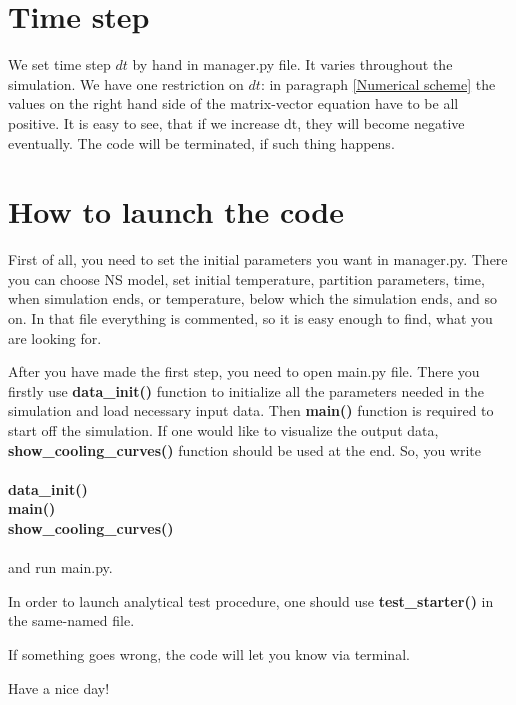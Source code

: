 \documentclass[preprint,pre,floats,aps,amsmath,amssymb]{revtex4}
\begin{document}
\section{Time step}
\par We set time step $dt$ by hand in manager.py file. It varies throughout the simulation. We have one restriction on $dt$: in paragraph \ref{Numerical scheme} the values on the right hand side of the matrix-vector equation have to be all positive. It is easy to see, that if we increase dt, they will become negative eventually. The code will be terminated, if such thing happens.
\section{How to launch the code}
\par  First of all, you need to set the initial parameters you want in manager.py. There you can choose NS model, set initial temperature, partition parameters, time, when simulation ends, or temperature, below which the simulation ends, and so on. In that file everything is commented, so it is easy enough to find, what you are looking for.
\par After you have made the first step, you need to open main.py file. There you firstly use \textbf{data\_init()} function to initialize all the parameters needed in the simulation and load necessary input data. Then \textbf{main()} function is required to start off the simulation. If one would like to visualize the output data, \textbf{show\_cooling\_curves()} function should be used at the end. So, you write \\ \\
  \textbf{data\_init()}  \\
    \textbf{main()} \\
     \textbf{ show\_cooling\_curves()} \\ \\
    and run main.py.  \\
    \par In order to launch analytical test procedure, one should use \textbf{test\_starter()} in the same-named file. \\
    \par If something goes wrong, the code will let you know via terminal. \\
    \par Have a nice day!
\end{document}
